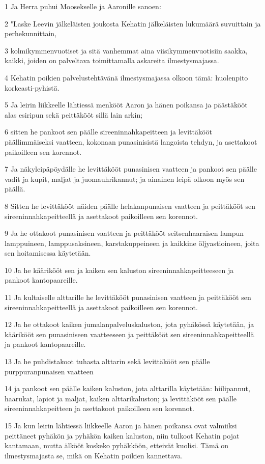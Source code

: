 \par 1 Ja Herra puhui Moosekselle ja Aaronille sanoen:
\par 2 "Laske Leevin jälkeläisten joukosta Kehatin jälkeläisten lukumäärä suvuittain ja perhekunnittain,
\par 3 kolmikymmenvuotiset ja sitä vanhemmat aina viisikymmenvuotisiin saakka, kaikki, joiden on palveltava toimittamalla askareita ilmestysmajassa.
\par 4 Kehatin poikien palvelustehtävänä ilmestysmajassa olkoon tämä: huolenpito korkeasti-pyhistä.
\par 5 Ja leirin liikkeelle lähtiessä menkööt Aaron ja hänen poikansa ja päästäkööt alas esiripun sekä peittäkööt sillä lain arkin;
\par 6 sitten he pankoot sen päälle sireeninnahkapeitteen ja levittäkööt päällimmäiseksi vaatteen, kokonaan punasinisistä langoista tehdyn, ja asettakoot paikoilleen sen korennot.
\par 7 Ja näkyleipäpöydälle he levittäkööt punasinisen vaatteen ja pankoot sen päälle vadit ja kupit, maljat ja juomauhrikannut; ja ainainen leipä olkoon myös sen päällä.
\par 8 Sitten he levittäkööt näiden päälle helakanpunaisen vaatteen ja peittäkööt sen sireeninnahkapeitteellä ja asettakoot paikoilleen sen korennot.
\par 9 Ja he ottakoot punasinisen vaatteen ja peittäkööt seitsenhaaraisen lampun lamppuineen, lamppusaksineen, karstakuppeineen ja kaikkine öljyastioineen, joita sen hoitamisessa käytetään.
\par 10 Ja he käärikööt sen ja kaiken sen kaluston sireeninnahkapeitteeseen ja pankoot kantopaareille.
\par 11 Ja kultaiselle alttarille he levittäkööt punasinisen vaatteen ja peittäkööt sen sireeninnahkapeitteellä ja asettakoot paikoilleen sen korennot.
\par 12 Ja he ottakoot kaiken jumalanpalveluskaluston, jota pyhäkössä käytetään, ja käärikööt sen punasiniseen vaatteeseen ja peittäkööt sen sireeninnahkapeitteellä ja pankoot kantopaareille.
\par 13 Ja he puhdistakoot tuhasta alttarin sekä levittäkööt sen päälle purppuranpunaisen vaatteen
\par 14 ja pankoot sen päälle kaiken kaluston, jota alttarilla käytetään: hiilipannut, haarukat, lapiot ja maljat, kaiken alttarikaluston; ja levittäkööt sen päälle sireeninnahkapeitteen ja asettakoot paikoilleen sen korennot.
\par 15 Ja kun leirin lähtiessä liikkeelle Aaron ja hänen poikansa ovat valmiiksi peittäneet pyhäkön ja pyhäkön kaiken kaluston, niin tulkoot Kehatin pojat kantamaan, mutta älkööt koskeko pyhäkköön, etteivät kuolisi. Tämä on ilmestysmajasta se, mikä on Kehatin poikien kannettava.
